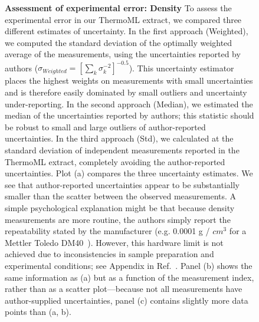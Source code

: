 \documentclass[aip, jcp, reprint]{revtex4-1}  %
\begin{document}
\begin{figure}
\caption{{\bf Assessment of experimental error: Density}
To assess the experimental error in our ThermoML extract, we compared three different estimates of uncertainty.  
In the first approach (Weighted), we computed the standard deviation of the optimally weighted average of the measurements, using the uncertainties reported by authors ($\sigma_{Weighted} = [\sum_k \sigma_k^{-2}]^{-0.5}$).
This uncertainty estimator places the highest weights on measurements with small uncertainties and is therefore easily dominated by small outliers and uncertainty under-reporting.
In the second approach (Median), we estimated the median of the uncertainties reported by authors; this statistic should be robust to small and large outliers of author-reported uncertainties.
In the third approach (Std), we calculated at the standard deviation of independent measurements reported in the ThermoML extract, completely avoiding the author-reported uncertainties.
Plot (a) compares the three uncertainty estimates.
We see that author-reported uncertainties appear to be substantially smaller than the scatter between the observed measurements.
A simple psychological explanation might be that because density measurements are more routine, the authors simply report the repeatability stated by the manufacturer (e.g. 0.0001 g / $cm^{3}$ for a Mettler Toledo DM40~\cite{mettlertoledo}).  
However, this hardware limit is not achieved due to inconsistencies in sample preparation and experimental conditions; see Appendix in Ref.~\cite{chirico2013improvement}.  
Panel (b) shows the same information as (a) but as a function of the measurement index, rather than as a scatter plot---because not all measurements have author-supplied uncertainties, panel (c) contains slightly more data points than (a, b).  
}
\label{figure:ErrorAnalysisDensity}

\end{figure}



\clearpage
\end{document}
